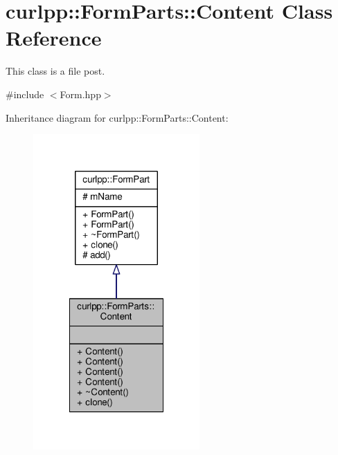 \hypertarget{classcurlpp_1_1FormParts_1_1Content}{\section{curlpp\-:\-:Form\-Parts\-:\-:Content Class Reference}
\label{classcurlpp_1_1FormParts_1_1Content}
}


This class is a file post.  




{\ttfamily \#include $<$Form.\-hpp$>$}



Inheritance diagram for curlpp\-:\-:Form\-Parts\-:\-:Content\-:\nopagebreak
\begin{figure}[H]
\begin{center}
\leavevmode
\includegraphics[width=180pt]{classcurlpp_1_1FormParts_1_1Content__inherit__graph}
\end{center}
\end{figure}


